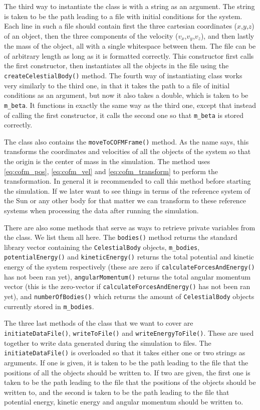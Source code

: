 \documentclass[reprint,english,notitlepage]{revtex4-1}  %
\begin{document}
\label{poi:initfile}
The third way to instantiate the class is with a string as an argument. The string is taken to be the path leading to a file with initial conditions for the system. Each line in such a file should contain first the three cartesian coordinates ($x$,$y$,$z$) of an object, then the three components of the velocity ($v_x$,$v_y$,$v_z$), and then  lastly the mass of the object, all with a single whitespace between them. The file can be of arbitrary length as long as it is formatted correctly. This constructor first calls the first constructor, then instantiates all the objects in the file using the \verb+createCelestialBody()+ method. The fourth way of instantiating class works very similarly to the third one, in that it takes the path to a file of initial conditions as an argument, but now it also takes a double, which is taken to be \verb+m_beta+. It functions in exactly the same way as the third one, except that instead of calling the first constructor, it calls the second one so that \verb+m_beta+ is stored correctly.

The class also contains the \verb+moveToCOFMFrame()+ method. As the name says, this transforms the coordinates and velocities of all the objects of the system so that the origin is the center of mass in the simulation. The method uses \eqref{eq:cofm_pos}, \eqref{eq:cofm_vel} and \eqref{eq:cofm_transform} to perform the transformation. In general it is recommended to call this method before starting the simulation. If we later want to see things in terms of the reference system of the Sun or any other body for that matter we can transform to these reference systems when processing the data after running the simulation. 

There are also some methods that serve as ways to retrieve private variables from the class. We list them all here. The \verb+bodies()+ method returns the standard library vector containing the \verb+CelestialBody+ objects, \verb+m_bodies+, \verb+potentialEnergy()+ and \verb+kineticEnergy()+ returns the total potential and kinetic energy of the system respectively (these are zero if \verb+calculateForcesAndEnergy()+ has not been ran yet), \verb+angularMomentum()+ returns the total angular momentum vector (this is the zero-vector if \verb+calculateForcesAndEnergy()+ has not been ran yet), and \verb+numberOfBodies()+ which returns the amount of \verb+CelestialBody+ objects currently stored in \verb+m_bodies+.  

The three last methods of the class that we want to cover are \verb+initiateDataFile()+, \verb+writeToFile()+ and \verb+writeEnergyToFile()+. These are used together to write data generated during the simulation to files. The \verb+initiateDataFile()+ is overloaded so that it takes either one or two strings as arguments. If one is given, it is taken to be the path leading to the file that the positions of all the objects should be written to. If two are given, the first one is taken to be the path leading to the file that the positions of the objects should be written to, and the second is taken to be the path leading to the file that potential energy, kinetic energy and angular momentum should be written to. \newline
\end{document}
